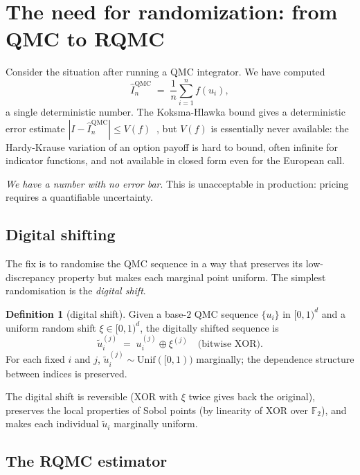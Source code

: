 \documentclass[11pt,a4paper]{article}
\theoremstyle{plain}
\theoremstyle{definition}
\newtheorem{definition}[theorem]{Definition}
\theoremstyle{remark}
\DeclareMathOperator{\Disc}{D^*}
\begin{document}
\section{The need for randomization: from QMC to RQMC}
\label{sec:rqmc}

Consider the situation after running a QMC integrator. We have
computed
\begin{equation}
\hat I_n^{\mathrm{QMC}} \;=\; \frac{1}{n} \sum_{i=1}^n f(u_i),
\end{equation}
a single deterministic number. The Koksma-Hlawka bound gives a
deterministic error estimate $|I - \hat I_n^{\mathrm{QMC}}| \leq
V(f) \Disc$, but $V(f)$ is essentially never available: the
Hardy-Krause variation of an option payoff is hard to bound, often
infinite for indicator functions, and not available in closed form
even for the European call.

\emph{We have a number with no error bar}. This is unacceptable in
production: pricing requires a quantifiable uncertainty.

\subsection{Digital shifting}

The fix is to randomise the QMC sequence in a way that preserves
its low-discrepancy property but makes each marginal point uniform.
The simplest randomisation is the \emph{digital shift}.

\begin{definition}[digital shift]
\label{def:digital-shift}
Given a base-$2$ QMC sequence $\{u_i\}$ in $[0, 1)^d$ and a uniform
random shift $\xi \in [0, 1)^d$, the digitally shifted sequence is
\begin{equation}
\tilde u_i^{(j)} \;=\; u_i^{(j)} \oplus \xi^{(j)}
\quad \text{(bitwise XOR)}.
\end{equation}
For each fixed $i$ and $j$, $\tilde u_i^{(j)} \sim
\mathrm{Unif}([0, 1))$ marginally; the dependence structure between
indices is preserved.
\end{definition}

The digital shift is reversible (XOR with $\xi$ twice gives back the
original), preserves the local properties of Sobol points (by
linearity of XOR over $\mathbb{F}_2$), and makes each individual
$\tilde u_i$ marginally uniform.

\subsection{The RQMC estimator}
\end{document}
